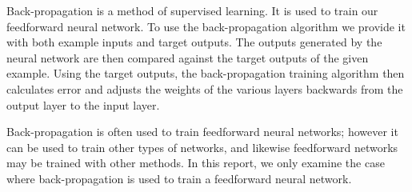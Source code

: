 \documentclass[11pt]{article}
\begin{document}
Back-propagation is a method of supervised learning. It is used to train our feedforward neural network. To use the back-propagation
algorithm we provide it with both example inputs and target outputs. The outputs generated by the neural network are then compared
against the target outputs of the given example. Using the target outputs, the back-propagation training algorithm then calculates error
and adjusts the weights of the various layers backwards from the output layer to the input layer.

Back-propagation is often used to train feedforward neural networks; however it can be used to train other types of networks, and
likewise feedforward networks may be trained with other methods. In this report, we only examine the case where back-propagation is used to train a feedforward neural network.



% 
\end{document}
